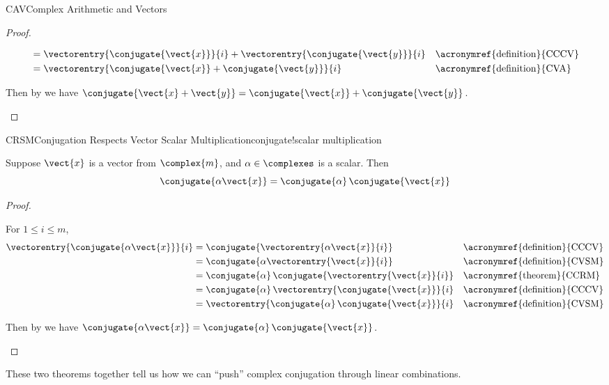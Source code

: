 \begin{subsect}{CAV}{Complex Arithmetic and Vectors}
\begin{proof}
\begin{para}
\begin{align*}
&=\vectorentry{\conjugate{\vect{x}}}{i}+\vectorentry{\conjugate{\vect{y}}}{i}&&\text{\acronymref{definition}{CCCV}}\\
&=\vectorentry{\conjugate{\vect{x}}+\conjugate{\vect{y}}}{i}&&\text{\acronymref{definition}{CVA}}
%
\end{align*}
\end{para}
%
\begin{para}Then by  we have $\conjugate{\vect{x}+\vect{y}}=\conjugate{\vect{x}}+\conjugate{\vect{y}}$.\end{para}
%
\end{proof}
%
%
\begin{theorem}{CRSM}{Conjugation Respects Vector Scalar Multiplication}{conjugate!scalar multiplication}
\begin{para}Suppose $\vect{x}$ is a vector from $\complex{m}$, and $\alpha\in\complexes$ is a scalar.  Then
%
\begin{equation*}
\conjugate{\alpha\vect{x}}=\conjugate{\alpha}\,\conjugate{\vect{x}}
\end{equation*}
\end{para}
%
\end{theorem}
%
\begin{proof}
%
\begin{para}For $1\leq i\leq m$,
%
\begin{align*}
\vectorentry{\conjugate{\alpha\vect{x}}}{i}
&=\conjugate{\vectorentry{\alpha\vect{x}}{i}}&&\text{\acronymref{definition}{CCCV}}\\
%
&=\conjugate{\alpha\vectorentry{\vect{x}}{i}}&&\text{\acronymref{definition}{CVSM}}\\
%
&=\conjugate{\alpha}\,\conjugate{\vectorentry{\vect{x}}{i}}&&\text{\acronymref{theorem}{CCRM}}\\
%
&=\conjugate{\alpha}\,\vectorentry{\conjugate{\vect{x}}}{i}&&\text{\acronymref{definition}{CCCV}}\\
%
&=\vectorentry{\conjugate{\alpha}\,\conjugate{\vect{x}}}{i}&&\text{\acronymref{definition}{CVSM}}\\
%
\end{align*}
\end{para}
%
\begin{para}Then by  we have $\conjugate{\alpha\vect{x}}=\conjugate{\alpha}\,\conjugate{\vect{x}}$.\end{para}
%
\end{proof}
%
\begin{para}These two theorems together tell us how we can ``push'' complex conjugation through linear combinations.
\end{para}
%
\end{subsect}

